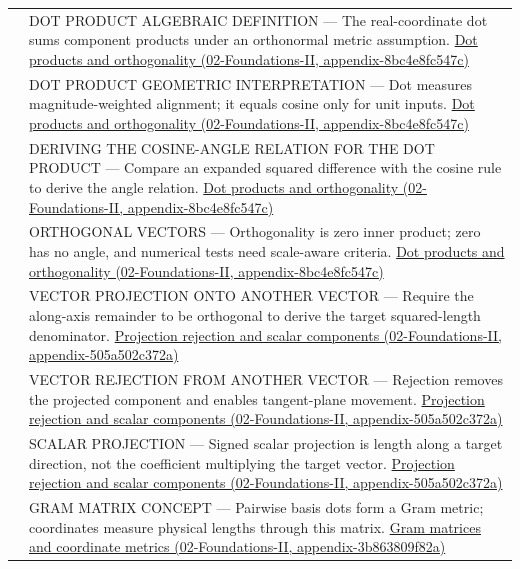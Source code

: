 {\begin{longtable}[]{@{}
  >{\raggedright\arraybackslash}p{}
  >{\raggedright\arraybackslash}p{}@{}}
534 & DOT PRODUCT ALGEBRAIC DEFINITION --- The real-coordinate dot sums component products under an orthonormal metric assumption. \href{../02-Foundations-II/main.pdf\#nameddest=appendix-8bc4e8fc547c}{Dot products and orthogonality (02-Foundations-II, appendix-8bc4e8fc547c)} \\
535 & DOT PRODUCT GEOMETRIC INTERPRETATION --- Dot measures magnitude-weighted alignment; it equals cosine only for unit inputs. \href{../02-Foundations-II/main.pdf\#nameddest=appendix-8bc4e8fc547c}{Dot products and orthogonality (02-Foundations-II, appendix-8bc4e8fc547c)} \\
536 & DERIVING THE COSINE-ANGLE RELATION FOR THE DOT PRODUCT --- Compare an expanded squared difference with the cosine rule to derive the angle relation. \href{../02-Foundations-II/main.pdf\#nameddest=appendix-8bc4e8fc547c}{Dot products and orthogonality (02-Foundations-II, appendix-8bc4e8fc547c)} \\
537 & ORTHOGONAL VECTORS --- Orthogonality is zero inner product; zero has no angle, and numerical tests need scale-aware criteria. \href{../02-Foundations-II/main.pdf\#nameddest=appendix-8bc4e8fc547c}{Dot products and orthogonality (02-Foundations-II, appendix-8bc4e8fc547c)} \\
538 & VECTOR PROJECTION ONTO ANOTHER VECTOR --- Require the along-axis remainder to be orthogonal to derive the target squared-length denominator. \href{../02-Foundations-II/main.pdf\#nameddest=appendix-505a502c372a}{Projection rejection and scalar components (02-Foundations-II, appendix-505a502c372a)} \\
539 & VECTOR REJECTION FROM ANOTHER VECTOR --- Rejection removes the projected component and enables tangent-plane movement. \href{../02-Foundations-II/main.pdf\#nameddest=appendix-505a502c372a}{Projection rejection and scalar components (02-Foundations-II, appendix-505a502c372a)} \\
540 & SCALAR PROJECTION --- Signed scalar projection is length along a target direction, not the coefficient multiplying the target vector. \href{../02-Foundations-II/main.pdf\#nameddest=appendix-505a502c372a}{Projection rejection and scalar components (02-Foundations-II, appendix-505a502c372a)} \\
541 & GRAM MATRIX CONCEPT --- Pairwise basis dots form a Gram metric; coordinates measure physical lengths through this matrix. \href{../02-Foundations-II/main.pdf\#nameddest=appendix-3b863809f82a}{Gram matrices and coordinate metrics (02-Foundations-II, appendix-3b863809f82a)} \\

\end{longtable}}
